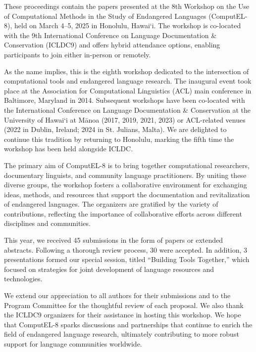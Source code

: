 These proceedings contain the papers presented at the 8th Workshop on the Use of Computational Methods in the Study of Endangered Languages (ComputEL-8), held on March 4–5, 2025 in Honolulu, Hawai‘i. The workshop is co-located with the 9th International Conference on Language Documentation & Conservation (ICLDC9) and offers hybrid attendance options, enabling participants to join either in-person or remotely.

As the name implies, this is the eighth workshop dedicated to the intersection of computational tools and endangered language research. The inaugural event took place at the Association for Computational Linguistics (ACL) main conference in Baltimore, Maryland in 2014. Subsequent workshops have been co-located with the International Conference on Language Documentation & Conservation at the University of Hawai‘i at Mānoa (2017, 2019, 2021, 2023) or ACL-related venues (2022 in Dublin, Ireland; 2024 in St. Julians, Malta). We are delighted to continue this tradition by returning to Honolulu, marking the fifth time the workshop has been held alongside ICLDC.

The primary aim of ComputEL-8 is to bring together computational researchers, documentary linguists, and community language practitioners. By uniting these diverse groups, the workshop fosters a collaborative environment for exchanging ideas, methods, and resources that support the documentation and revitalization of endangered languages. The organizers are gratified by the variety of contributions, reflecting the importance of collaborative efforts across different disciplines and communities.

This year, we received 45 submissions in the form of papers or extended abstracts. Following a thorough review process, 30 were accepted. In addition, 3 presentations formed our special session, titled “Building Tools Together,” which focused on strategies for joint development of language resources and technologies.

We extend our appreciation to all authors for their submissions and to the Program Committee for the thoughtful review of each proposal. We also thank the ICLDC9 organizers for their assistance in hosting this workshop. We hope that ComputEL-8 sparks discussions and partnerships that continue to enrich the field of endangered language research, ultimately contributing to more robust support for language communities worldwide.